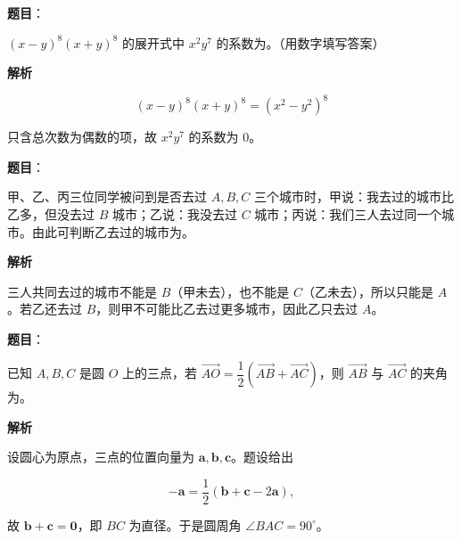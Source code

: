 \begin{answer}

\textbf{题目}：

$(x-y)^8(x+y)^8$ 的展开式中 $x^2y^7$ 的系数为\gkblank{}。（用数字填写答案）

\textbf{解析}

\nopagebreak[4]
\[
(x-y)^8(x+y)^8=(x^2-y^2)^8
\]

只含总次数为偶数的项，故 $x^2y^7$ 的系数为 $0$。


\end{answer}
\begin{answer}

\textbf{题目}：

甲、乙、丙三位同学被问到是否去过 $A,B,C$ 三个城市时，甲说：我去过的城市比乙多，但没去过 $B$ 城市；乙说：我没去过 $C$ 城市；丙说：我们三人去过同一个城市。由此可判断乙去过的城市为\gkblank{}。

\textbf{解析}

三人共同去过的城市不能是 $B$（甲未去），也不能是 $C$（乙未去），所以只能是 $A$。若乙还去过 $B$，则甲不可能比乙去过更多城市，因此乙只去过 $A$。


\end{answer}
\begin{answer}

\textbf{题目}：

已知 $A,B,C$ 是圆 $O$ 上的三点，若 $\overrightarrow{AO}=\dfrac12(\overrightarrow{AB}+\overrightarrow{AC})$，则 $\overrightarrow{AB}$ 与 $\overrightarrow{AC}$ 的夹角为\gkblank{}。

\textbf{解析}

设圆心为原点，三点的位置向量为 $\boldsymbol a,\boldsymbol b,\boldsymbol c$。题设给出

\nopagebreak[4]
\[
-\boldsymbol a=\frac12(\boldsymbol b+\boldsymbol c-2\boldsymbol a),
\]

故 $\boldsymbol b+\boldsymbol c=\boldsymbol0$，即 $BC$ 为直径。于是圆周角 $\angle BAC=90^\circ$。


\end{answer}
